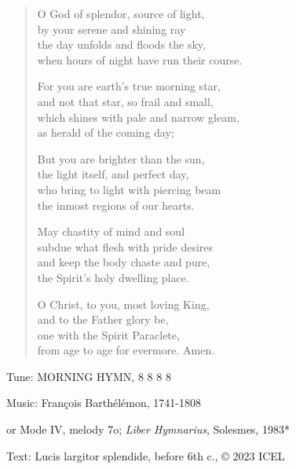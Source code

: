 \hymn

\begin{verse}
O God of splendor, source of light,\\
by your serene and shining ray\\
the day unfolds and floods the sky,\\
when hours of night have run their course.

For you are earth’s true morning star,\\
and not that star, so frail and small,\\
which shines with pale and narrow gleam,\\
as herald of the coming day;

But you are brighter than the sun,\\
the light itself, and perfect day,\\
who bring to light with piercing beam\\
the inmost regions of our hearts.

May chastity of mind and soul\\
subdue what flesh with pride desires\\
and keep the body chaste and pure,\\
the Spirit’s holy dwelling place.

O Christ, to you, most loving King,\\
and to the Father glory be,\\
one with the Spirit Paraclete,\\
from age to age for evermore. Amen.
\end{verse}

\begin{hymnsource}
Tune: MORNING HYMN, 8 8 8 8

Music: François Barthélémon, 1741-1808

or Mode IV, melody 7o; \emph{Liber Hymnarius}, Solesmes, 1983*

Text: Lucis largitor splendide, before 6th c., © 2023 ICEL
\end{hymnsource}